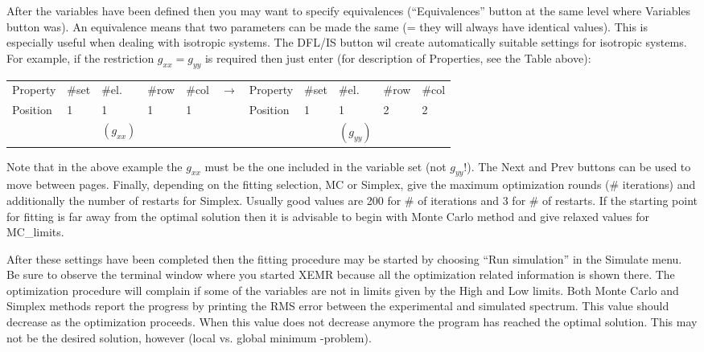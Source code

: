 \documentclass[byrevtex,amssymb,aps,pra,floatfix,letterpaper]{revtex4}
\begin{document}
After the variables have been defined then you may want to specify equivalences (``Equivalences'' button at the same level where Variables button was). An equivalence means that two parameters can be made the same (= they will always have identical values). This is especially useful when dealing with isotropic
systems. The DFL/IS button wil create automatically suitable settings for isotropic systems. For example, if the restriction $g_{xx} = g_{yy}$ is required then just enter (for description of Properties, see the Table above):\\

\begin{center}
{\small
\begin{tabular}{lllllllllll}
Property & \#set & \#el. & \#row & \#col & $\rightarrow$ & Property & \#set & \#el. & \#row & \#col\\
Position & 1     & 1     & 1  &  1  & & Position & 1 &    1  &    2  &    2\\
         &       & $(g_{xx})$ & & & & & & $(g_{yy})$\\
\end{tabular}
}
\end{center}\vspace*{0.2cm}

\noindent
Note that in the above example the $g_{xx}$ must be the one included in the variable set (not $g_{yy}$!). The Next and Prev buttons can be used to move between pages. Finally, depending on the fitting selection, MC or Simplex, give the maximum optimization rounds (\# iterations) and additionally the number of restarts for Simplex. Usually good values are 200 for \# of iterations and 3 for \# of restarts. If the starting point for fitting is far away from the optimal solution then it is advisable to begin with Monte Carlo method and give relaxed values for MC\_limits.

After these settings have been completed then the fitting procedure may be started by choosing ``Run simulation'' in the Simulate menu. Be sure to observe the terminal window where you started XEMR because all the optimization related information is shown there. The optimization procedure will complain if some of the variables are not in limits given by the High and Low limits. Both Monte Carlo and Simplex methods report the progress by printing the RMS error between the experimental and simulated spectrum. This value should decrease as the optimization proceeds. When this value does not decrease anymore the
program has reached the optimal solution. This may not be the desired solution, however (local vs. global minimum -problem).
\end{document}
